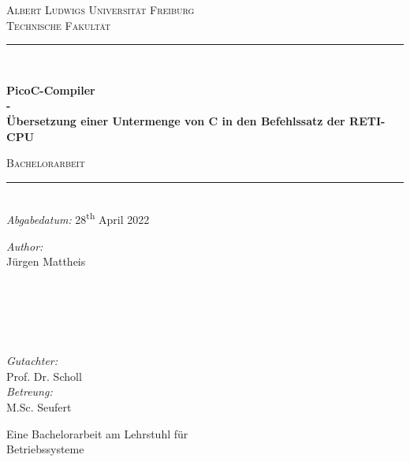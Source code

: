 \begin{titlepage}
  \vspace{1cm}
  \center
  \textsc{\LARGE Albert Ludwigs Universität Freiburg}\\[0.5cm]
  \textsc{\Large Technische Fakultät}\\[2.0cm]

  \rule{\linewidth}{0.5mm}\\[0.5cm]
    {\huge \bfseries PicoC-Compiler\\\LARGE - \\ Übersetzung einer Untermenge von C in den Befehlssatz der RETI-CPU\par}
    \vspace{0.5cm}
    \textsc{\large Bachelorarbeit}\\
    \rule{\linewidth}{0.5mm}\\[0.5cm]

  {\large \emph{Abgabedatum:} 28\textsuperscript{th} April 2022}\\[2.5cm]

  \begin{minipage}{0.45\textwidth}
    \begin{flushleft} \large
      \emph{Author:}\\
      Jürgen Mattheis\\
      \hspace{1cm}\\
      \hspace{1cm}\\
      \hspace{1cm}\\
      \hspace{1cm}
    \end{flushleft}
  \end{minipage}
  ~
  \begin{minipage}{0.45\textwidth}
    \begin{flushright} \large
      \emph{Gutachter:}\\
      Prof. Dr. Scholl\\[0.64cm]
      \emph{Betreung:}\\
      M.Sc. Seufert\\
    \end{flushright}
  \end{minipage}

  \vspace{9.5cm}
  \large{Eine Bachelorarbeit am Lehrstuhl für}\\
  \large{Betriebssysteme}
\end{titlepage}
